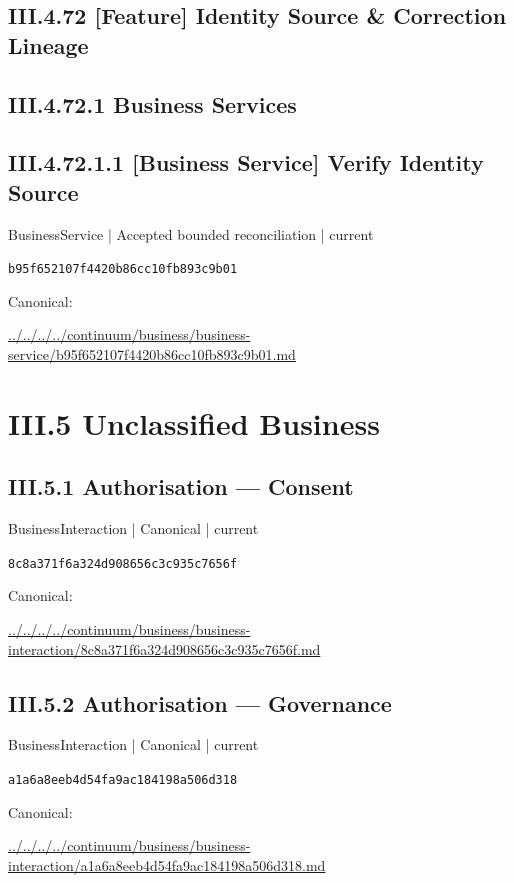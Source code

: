 \documentclass[10pt,a4paper]{article}
\begin{document}
\subsection*{III.4.72 [Feature] Identity Source \& Correction Lineage}
\subsection*{III.4.72.1 Business Services}
\subsection*{III.4.72.1.1 [Business Service] Verify Identity Source}
{\small BusinessService | Accepted bounded reconciliation | current}\par
\texttt{b95f652107f4420b86cc10fb893c9b01}\par
Canonical: \par
{\footnotesize\url{../../../../continuum/business/business-service/b95f652107f4420b86cc10fb893c9b01.md}}\par
\section*{III.5 Unclassified Business}
\subsection*{III.5.1 Authorisation — Consent}
{\small BusinessInteraction | Canonical | current}\par
\texttt{8c8a371f6a324d908656c3c935c7656f}\par
Canonical: \par
{\footnotesize\url{../../../../continuum/business/business-interaction/8c8a371f6a324d908656c3c935c7656f.md}}\par
\subsection*{III.5.2 Authorisation — Governance}
{\small BusinessInteraction | Canonical | current}\par
\texttt{a1a6a8eeb4d54fa9ac184198a506d318}\par
Canonical: \par
{\footnotesize\url{../../../../continuum/business/business-interaction/a1a6a8eeb4d54fa9ac184198a506d318.md}}\par
\end{document}
